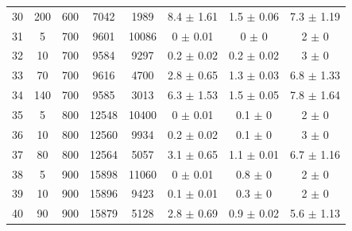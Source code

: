 \documentclass[11pt]{article}
\begin{document}
\begin{table}[]
{\begin{tabular}{cccccccc}
				30 & 200 & 600 & 7042 & 1989 & 8.4 $\pm$ 1.61 & 1.5 $\pm$ 0.06 & 7.3 $\pm$ 1.19 \\
				\rowcolor[HTML]{EFEFEF} 
				31 & 5 & 700 & 9601 & 10086 & 0 $\pm$ 0.01 & 0 $\pm$ 0 & 2 $\pm$ 0 \\
				\rowcolor[HTML]{EFEFEF} 
				32 & 10 & 700 & 9584 & 9297 & 0.2 $\pm$ 0.02 & 0.2 $\pm$ 0.02 & 3 $\pm$ 0 \\
				\rowcolor[HTML]{EFEFEF} 
				33 & 70 & 700 & 9616 & 4700 & 2.8 $\pm$ 0.65 & 1.3 $\pm$ 0.03 & 6.8 $\pm$ 1.33 \\
				\rowcolor[HTML]{EFEFEF} 
				34 & 140 & 700 & 9585 & 3013 & 6.3 $\pm$ 1.53 & 1.5 $\pm$ 0.05 & 7.8 $\pm$ 1.64 \\
				35 & 5 & 800 & 12548 & 10400 & 0 $\pm$ 0.01 & 0.1 $\pm$ 0 & 2 $\pm$ 0 \\
				36 & 10 & 800 & 12560 & 9934 & 0.2 $\pm$ 0.02 & 0.1 $\pm$ 0 & 3 $\pm$ 0 \\
				37 & 80 & 800 & 12564 & 5057 & 3.1 $\pm$ 0.65 & 1.1 $\pm$ 0.01 & 6.7 $\pm$ 1.16 \\
				\rowcolor[HTML]{EFEFEF} 
				38 & 5 & 900 & 15898 & 11060 & 0 $\pm$ 0.01 & 0.8 $\pm$ 0 & 2 $\pm$ 0 \\
				\rowcolor[HTML]{EFEFEF} 
				39 & 10 & 900 & 15896 & 9423 & 0.1 $\pm$ 0.01 & 0.3 $\pm$ 0 & 2 $\pm$ 0 \\
				\rowcolor[HTML]{EFEFEF} 
				40 & 90 & 900 & 15879 & 5128 & 2.8 $\pm$ 0.69 & 0.9 $\pm$ 0.02 & 5.6 $\pm$ 1.13
			\end{tabular}%
		}
	\end{table}
	
\end{document}

